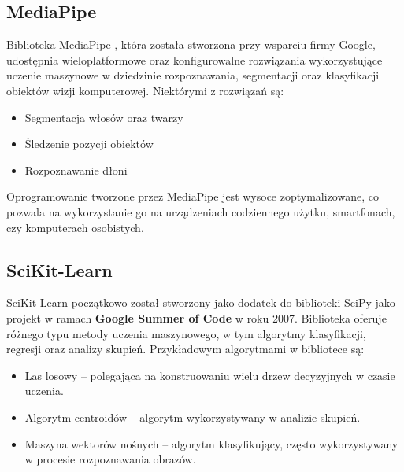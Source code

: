 \subsection{MediaPipe}

\quad Biblioteka MediaPipe \cite{bib:mediapipe} \cite{bib:mediapipe_1}, która została stworzona przy wsparciu firmy Google, udostępnia wieloplatformowe oraz konfigurowalne rozwiązania wykorzystujące uczenie maszynowe w dziedzinie rozpoznawania, segmentacji oraz klasyfikacji obiektów wizji komputerowej. Niektórymi z rozwiązań są:

\begin{itemize}
    \item Segmentacja włosów oraz twarzy
    \item Śledzenie pozycji obiektów
    \item Rozpoznawanie dłoni
\end{itemize}

\quad Oprogramowanie tworzone przez MediaPipe jest wysoce zoptymalizowane, co pozwala na wykorzystanie go na urządzeniach codziennego użytku, smartfonach, czy komputerach osobistych. 

\subsection{SciKit-Learn}

\quad SciKit-Learn \cite{bib:scikit} \cite{bib:scikit_basics} początkowo został stworzony jako dodatek do biblioteki SciPy jako projekt w ramach \textbf{Google Summer of Code} w roku 2007. Biblioteka oferuje różnego typu metody uczenia maszynowego, w tym algorytmy klasyfikacji, regresji oraz analizy skupień. Przykładowym algorytmami w bibliotece są:
\begin{itemize}
    \item Las losowy -- polegająca na konstruowaniu wielu drzew decyzyjnych w czasie uczenia. 
    \item Algorytm centroidów -- algorytm wykorzystywany w analizie skupień.
    \item Maszyna wektorów nośnych -- algorytm klasyfikujący, często wykorzystywany w procesie rozpoznawania obrazów. 
\end{itemize}